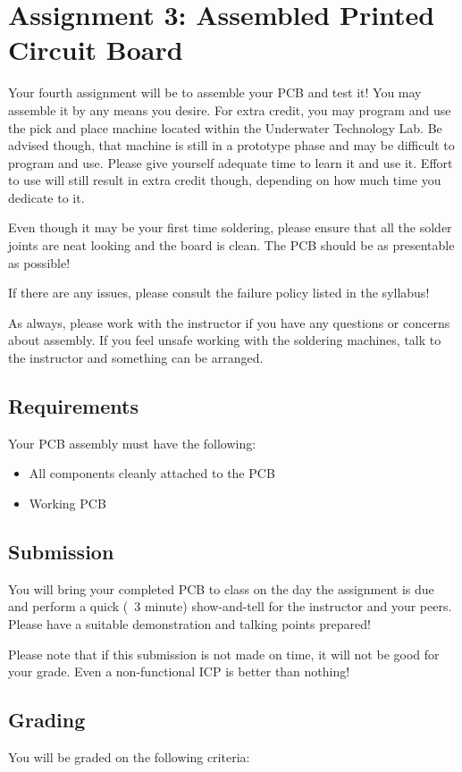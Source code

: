 \section*{Assignment 3: Assembled Printed Circuit Board}
Your fourth assignment will be to assemble your PCB and test it!
You may assemble it by any means you desire.
For extra credit, you may program and use the pick and place machine located within the Underwater Technology Lab.
Be advised though, that machine is still in a prototype phase and may be difficult to program and use.
Please give yourself adequate time to learn it and use it.
Effort to use will still result in extra credit though, depending on how much time you dedicate to it.

Even though it may be your first time soldering, please ensure that all the solder joints are neat looking and the board is clean.
The PCB should be as presentable as possible!

If there are any issues, please consult the failure policy listed in the syllabus!

As always, please work with the instructor if you have any questions or concerns about assembly.
If you feel unsafe working with the soldering machines, talk to the instructor and something can be arranged.

    \subsection*{Requirements}
    Your PCB assembly must have the following:
    \begin{itemize}
        \item All components cleanly attached to the PCB
        \item Working PCB
    \end{itemize}

    \subsection*{Submission}
    You will bring your completed PCB to class on the day the assignment is due and perform a quick (~3 minute) show-and-tell for the instructor and your peers.
    Please have a suitable demonstration and talking points prepared!

    Please note that if this submission is not made on time, it will not be good for your grade.
    Even a non-functional ICP is better than nothing!

    \subsection*{Grading}
    You will be graded on the following criteria:

